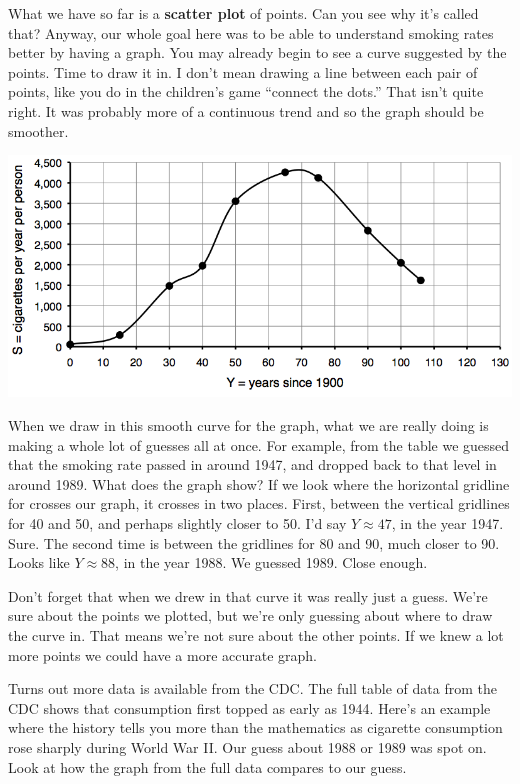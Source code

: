 What we have so far is a \textbf{scatter plot} of points.  Can you see why it's called that?  Anyway, our whole goal here was to be able to understand smoking rates better by having a graph.  You may already begin to see a curve suggested by the points. Time to draw it in.  I don't mean drawing a line between each pair of points, like you do in the children's game ``connect the dots.''  That isn't quite right.  It was probably more of a continuous trend and so the graph should be smoother.  
\begin{center}
 {\includegraphics [width = 6in] {CigCurve.png}}
\end{center}

When we draw in this smooth curve for the graph, what we are really doing is making a whole lot of guesses all at once.  For example, from the table we guessed that the smoking rate passed   in around 1947, and dropped back to that level in around 1989.  What does the graph show?  If we look where the horizontal gridline for  crosses our graph, it crosses in two places.  First, between the vertical gridlines for 40 and 50, and perhaps slightly closer to 50.  I'd say $Y \approx 47$, in the year 1947.  Sure.  The second time is between the gridlines for 80 and 90, much closer to 90.  Looks like $Y \approx 88$, in the year 1988. We guessed 1989.  Close enough.

Don't forget that when we drew in that curve it was really just a guess.  We're sure about the points we plotted, but we're only guessing about where to draw the curve in.  That means we're not sure about the other points.  If we knew a lot more points we could have a more accurate graph. 

Turns out  more data is available from the CDC.  The full table of data from the CDC shows that consumption first topped  as early as 1944.  Here's an example where the history tells you more than the mathematics as cigarette consumption rose sharply during World War II.  Our guess about 1988 or 1989 was spot on.  Look at how the graph from the full data compares to our guess.  

